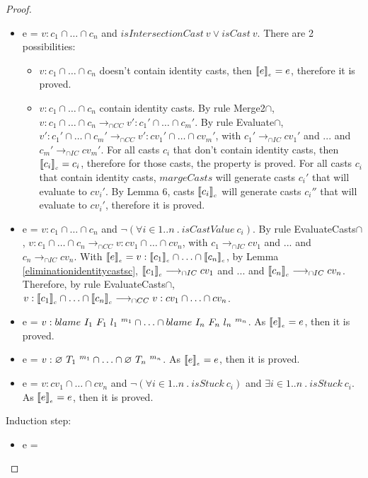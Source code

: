 \documentclass[a4paper]{article}
\begin{document}
\begin{proof}
\begin{itemize}
    \fi
    \item e = $v : c_1 \cap \ldots \cap c_n$ and $isIntersectionCast\ v \lor isCast\ v$.
    There are 2 possibilities:
    \begin{itemize}
        \item $v : c_1 \cap \ldots \cap c_n$ doesn't contain identity casts, then $\llbracket e \rrbracket_{_e} = e$, therefore it is proved.
        \item $v : c_1 \cap \ldots \cap c_n$ contain identity casts.
        By rule Merge2$\cap$, $v : c_1 \cap \ldots \cap c_n \longrightarrow_{\cap CC} v' : c_1' \cap \ldots \cap c_m'$.
        By rule Evaluate$\cap$, $v' : c_1' \cap \ldots \cap c_m' \longrightarrow_{\cap CC} v' : cv_1' \cap \ldots \cap cv_m'$, with $c_1' \longrightarrow_{\cap IC} cv_1'$ and ... and $c_m' \longrightarrow_{\cap IC} cv_m'$.
        For all casts $c_i$ that don't contain identity casts, then $\llbracket c_i \rrbracket_{_c} = c_i$, therefore for those casts, the property is proved.
        For all casts $c_i$ that contain identity casts, $margeCasts$ will generate casts $c_i'$ that will evaluate to $cv_i'$.
        By Lemma 6, casts $\llbracket c_i \rrbracket_{_c}$ will generate casts $c_i''$ that will evaluate to $cv_i'$, therefore it is proved.
    \end{itemize}
    \item e = $v : c_1 \cap \ldots \cap c_n$ and $\neg(\forall i \in 1 .. n\ .\ isCastValue\ c_i)$.
    By rule EvaluateCasts$\cap$, $v : c_1 \cap \ldots \cap c_n \longrightarrow_{\cap CC} v : cv_1 \cap \ldots \cap cv_n$, with $c_1 \longrightarrow_{\cap IC} cv_1$ and ... and $c_n \longrightarrow_{\cap IC} cv_n$.
    With $\llbracket e \rrbracket_{_e} = v : \llbracket c_1 \rrbracket_{_c} \cap \ldots \cap \llbracket c_n \rrbracket_{_c}$, by Lemma \ref{eliminationidentitycastsc}, $\llbracket c_1 \rrbracket_{_c} \longrightarrow_{\cap IC} cv_1$ and ... and $\llbracket c_n \rrbracket_{_c} \longrightarrow_{\cap IC} cv_n$.
    Therefore, by rule EvaluateCasts$\cap$, $v : \llbracket c_1 \rrbracket_{_c} \cap \ldots \cap \llbracket c_n \rrbracket_{_c} \longrightarrow_{\cap CC} v : cv_1 \cap \ldots \cap cv_n$.
    \item e = $v : blame\ I_1\ F_1\ l_1\ ^{m_1} \cap \ldots \cap blame\ I_n\ F_n\ l_n\ ^{m_n}$.
    As $\llbracket e \rrbracket_{_e} = e$, then it is proved.
    \item e = $v : \varnothing\ T_1\ ^{m_1} \cap \ldots \cap \varnothing\ T_n\ ^{m_n}$.
    As $\llbracket e \rrbracket_{_e} = e$, then it is proved.
    \item e = $v : cv_1 \cap \ldots \cap cv_n$ and $\neg(\forall i \in 1 .. n\ .\ isStuck\ c_i)$ and $\exists i \in 1 .. n\ .\ isStuck\ c_i$.
    As $\llbracket e \rrbracket_{_e} = e$, then it is proved.

\end{itemize}
Induction step:
\begin{itemize}
    \item e =
\end{itemize}
\end{proof}
\end{document}
